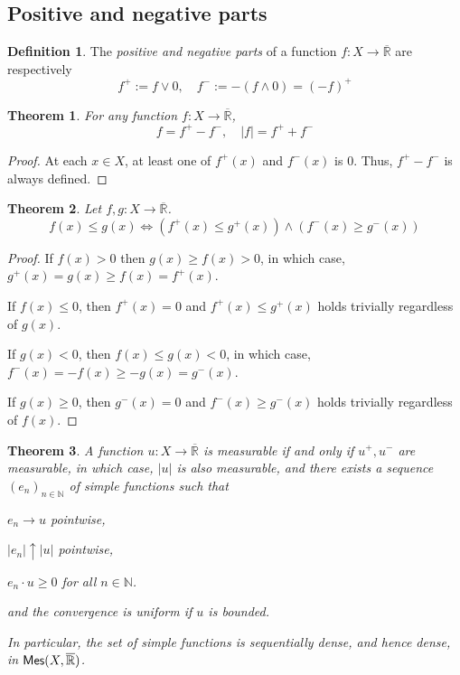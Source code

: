 \documentclass[11pt, a4paper, openany]{book}
\newtheorem{thm}{Theorem}\newtheorem{lem}{Lemma}\newtheorem{crl}{Corollary}
\theoremstyle{definition}
\newtheorem{define}{Definition}\newtheorem{exam}{Example}\newtheorem{remark}{Remark}
\newcommand{\cat}[1]{\textup{\textsf{#1}}}
\newcommand{\er}{\overline{\mathbb{R}}}
\newenvironment{tight_enumerate}{\begin{enumerate}\itemsep -0.2em}{\end{enumerate}}
\begin{document}
\subsection{Positive and negative parts}
    \begin{define}
        The \textit{positive and negative parts} of a function $f:X\rightarrow \er$ are respectively
        \[
            f^+:=f\vee 0,\quad f^-:=-(f\wedge 0)=(-f)^+
        \]
    \end{define}
    \begin{thm}\label{decomposition into positive and negative parts}
        For any function $f:X\rightarrow \er$,
        \[
            f=f^+-f^-,\quad |f|=f^++f^-
        \]
    \end{thm}
    \begin{proof}
        At each $x\in X$, at least one of $f^+(x)$ and $f^-(x)$ is $0$. Thus, $f^+-f^-$ is always defined.
    \end{proof}
    \begin{thm}\label{positive parts preserve order relation while negative parts reverse}
        Let $f,g:X\rightarrow \er$.
        \[
            f(x)\leqslant g(x)\Longleftrightarrow (f^+(x)\leqslant g^+(x))\wedge (f^-(x)\geqslant g^-(x))
        \]
    \end{thm}
    \begin{proof}
        If $f(x)> 0$ then $g(x)\geqslant f(x)> 0$, in which case, $g^+(x)=g(x)\geqslant f(x)=f^+(x)$. 
        
        If $f(x)\leqslant 0$, then $f^+(x)=0$ and $f^+(x)\leqslant g^+(x)$ holds trivially regardless of $g(x)$.
        
        If $g(x)< 0$, then $f(x)\leqslant g(x)<0$, in which case, $f^-(x)=-f(x)\geqslant -g(x)=g^-(x)$.
        
        If $g(x)\geqslant 0$, then $g^-(x)=0$ and $f^-(x)\geqslant g^-(x)$ holds trivially regardless of $f(x)$.
    \end{proof}
    \begin{thm}\label{exsombrero}
        A function $u:X\rightarrow \er$ is measurable if and only if $u^+,u^-$ are measurable, in which case, $|u|$ is also measurable, and there exists a sequence $(e_n)_{n\in\mathbb{N}}$ of simple functions such that
        \begin{tight_enumerate}
            \item $e_n\to u$ pointwise,
            \item $|e_n|\uparrow |u|$ pointwise,
            \item $e_n\cdot u\geqslant 0$ for all $n\in\mathbb{N}$.
        \end{tight_enumerate}
        and the convergence is uniform if $u$ is bounded.

        In particular, the set of simple functions is sequentially dense, and hence dense, in $\cat{Mes}(X,\er)$.
    \end{thm}
\end{document}
